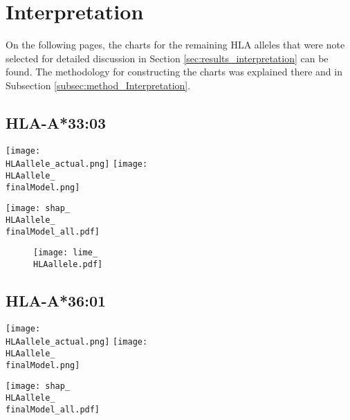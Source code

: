 \documentclass[msc,deptreport,ai]{infthesis} %
\newcommand{\finalModel}{epoch=4-step=3648186}
\newcommand{\HLAallele}{HLA-A3301}
\newcommand{\HLAalleleName}{HLA-A*33:01}
\begin{document}
	\section{Interpretation}
		On the following pages, the charts for the remaining \gls{HLA} alleles that were note selected for detailed discussion in Section \ref{sec:results_interpretation} can be found. The methodology for constructing the charts was explained there  and in Subsection \ref{subsec:method_Interpretation}.

		\newpage
		\renewcommand{\HLAallele}{HLA-A3303}
		\renewcommand{\HLAalleleName}{HLA-A*33:03}
		\subsection{\HLAalleleName}
				\noindent \begin{minipage}[c][4.2cm][t]{7cm}
					\begin{center}
					\texttt{[image: \\HLAallele\_actual.png]}
					\texttt{[image: \\HLAallele\_\\finalModel.png]} 
					\end{center}
				\end{minipage}
				\begin{minipage}[c][4.2cm][t]{7cm}
					\begin{center}
					\texttt{[image: shap\_\\HLAallele\_\\finalModel\_all.pdf]}
					\end{center}
				\end{minipage}
				
				\noindent \begin{figure}[H] {\centering
						\texttt{[image: lime\_\\HLAallele.pdf]} 
						\label{fig:LIME_\HLAallele} }
				\end{figure}



		\renewcommand{\HLAallele}{HLA-A3601}
		\renewcommand{\HLAalleleName}{HLA-A*36:01}
		\subsection{\HLAalleleName}
				\noindent \begin{minipage}[c][4.2cm][t]{7cm}
					\begin{center}
					\texttt{[image: \\HLAallele\_actual.png]}
					\texttt{[image: \\HLAallele\_\\finalModel.png]} 
					\end{center}
				\end{minipage}
				\begin{minipage}[c][4.2cm][t]{7cm}
					\begin{center}
					\texttt{[image: shap\_\\HLAallele\_\\finalModel\_all.pdf]}
					\end{center}
				\end{minipage}
				
\end{document}

